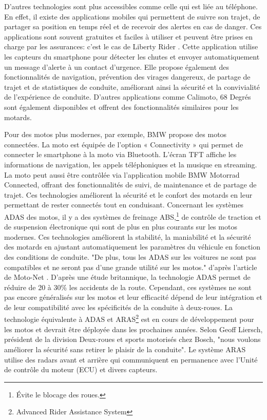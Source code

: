 D'autres technologies sont plus accessibles comme celle qui est liée au téléphone. En effet, il existe des applications mobiles qui permettent de suivre son trajet, de partager sa position en temps réel et de recevoir des alertes en cas de danger. Ces applications sont souvent gratuites et faciles à utiliser et peuvent être prises en charge par les assurances: c'est le cas de Liberty Rider \cite{liberty_rider}. Cette application utilise les capteurs du smartphone pour détecter les chutes et envoyer automatiquement un message d'alerte à un contact d’urgence. Elle propose également des fonctionnalités de navigation, prévention des virages dangereux, de partage de trajet et de statistiques de conduite, améliorant ainsi la sécurité et la convivialité de l’expérience de conduite. D'autres applications comme Calimoto, 68 Degrés sont également disponibles et offrent des fonctionnalités similaires pour les motards.

Pour des motos plus modernes, par exemple, BMW propose des motos connectées\cite{bmw_adas}. La moto est équipée de l’option « Connectivity » qui permet de connecter le smartphone à la moto via Bluetooth. L’écran TFT affiche les informations de navigation, les appels téléphoniques et la musique en streaming. La moto peut aussi être contrôlée via l’application mobile BMW Motorrad Connected, offrant des fonctionnalités de suivi, de maintenance et de partage de trajet. Ces technologies améliorent la sécurité et le confort des motards en leur permettant de rester connectés tout en conduisant.
Concernant les systèmes ADAS des motos\cite{moto_adas}, il y a des systèmes de freinage ABS,\footnote{Évite le blocage des roues.} de contrôle de traction et de suspension électronique qui sont de plus en plus courants sur les motos modernes. Ces technologies améliorent la stabilité, la maniabilité et la sécurité des motards en ajustant automatiquement les paramètres du véhicule en fonction des conditions de conduite. "De plus, tous les ADAS sur les voitures ne sont pas compatibles et ne seront pas d’une grande utilité sur les motos." d'après l'article de Moto-Net \cite{moto_adas}.
D'après une étude britannique, la technologie ADAS permet de réduire de 20 à 30\%\cite{moto_aras} les accidents de la route. Cependant, ces systèmes ne sont pas encore généralisés sur les motos et leur efficacité dépend de leur intégration et de leur compatibilité avec les spécificités de la conduite à deux-roues. La technologie équivalente à ADAS et ARAS\footnote{Advanced Rider Assistance System} est en cours de développement pour les motos et devrait être déployée dans les prochaines années.
Selon Geoff Liersch, président de la division Deux-roues et sports motorisés chez Bosch, "nous voulons améliorer la sécurité sans retirer le plaisir de la conduite"\cite{aras_bosh}.
Le système ARAS utilise des radars avant et arrière qui communiquent en permanence avec l’Unité de contrôle du moteur (ECU) et divers capteurs.

